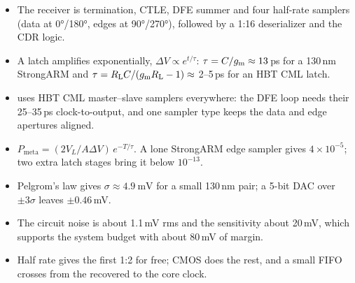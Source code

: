 \begin{takeaways}
\begin{itemize}
  \item The \OS{} receiver is termination, CTLE, DFE summer and four half-rate samplers (data at \ang{0}/\ang{180}, edges at \ang{90}/\ang{270}), followed by a 1:16 deserializer and the CDR logic.
  \item A latch amplifies exponentially, $\Delta V\propto e^{t/\tau}$: $\tau=C/g_\mathrm{m}\approx13$\,ps for a 130\,nm StrongARM and $\tau=R_\mathrm{L} C/(g_\mathrm{m}R_\mathrm{L}-1)\approx$ 2--5\,ps for an \sgx{} HBT CML latch.
  \item \OS{} uses HBT CML master--slave samplers everywhere: the DFE loop needs their 25--35\,ps clock-to-output, and one sampler type keeps the data and edge apertures aligned.
  \item $P_\mathrm{meta}=(2V_L/A\Delta V)\,e^{-T/\tau}$. A lone StrongARM edge sampler gives $4\times10^{-5}$; two extra latch stages bring it below $10^{-13}$.
  \item Pelgrom's law gives $\sigma\approx\qty{4.9}{\milli\volt}$ for a small 130\,nm pair; a 5-bit DAC over $\pm3\sigma$ leaves $\pm0.46$\,mV.
  \item The circuit noise is about 1.1\,mV rms and the sensitivity about 20\,mV, which supports the system budget with about 80\,mV of margin.
  \item Half rate gives the first 1:2 for free; CMOS does the rest, and a small FIFO crosses from the recovered to the core clock.
\end{itemize}
\end{takeaways}
